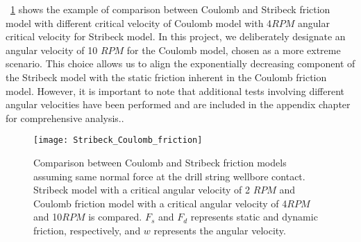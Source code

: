 \figurename~\ref{figure:stribeck_coulomb_friction} shows the example of comparison between Coulomb and Stribeck friction model with different critical velocity of Coulomb model with 4$RPM$ angular critical velocity for Stribeck model. In this project, we deliberately designate an angular velocity of 10 $RPM$ for the Coulomb model, chosen as a more extreme scenario. This choice allows us to align the exponentially decreasing component of the Stribeck model with the static friction inherent in the Coulomb friction model. However, it is important to note that additional tests involving different angular velocities have been performed and are included in the appendix chapter for comprehensive analysis..
\begin{figure}
  \centering
  \texttt{[image: Stribeck\_Coulomb\_friction]}
  \caption[Comparison between Coulomb and Stribeck friction model]{Comparison between Coulomb and Stribeck friction models assuming same normal force at the drill string wellbore contact. Stribeck model with a critical angular velocity of 2 $RPM$ and Coulomb friction model with a critical angular velocity of 4$RPM$ and 10$RPM$ is compared. $F_s$ and $F_d$ represents static and dynamic friction, respectively, and $w$ represents the angular velocity.}\label{figure:stribeck_coulomb_friction}
\end{figure}

